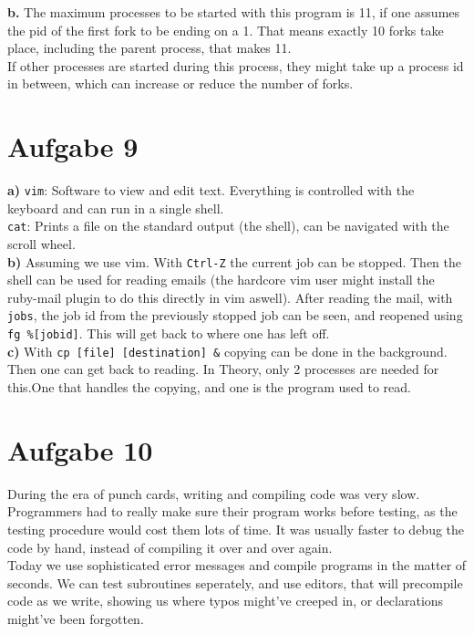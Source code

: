 \documentclass{article}
\begin{document}
\textbf{b.} The maximum processes to be started with this program is 11, if 
one assumes the pid of the first fork to be ending on a 1. That means
exactly 10 forks take place, including the parent process, that makes 11.\\
If other processes are started during this process, they might take up
a process id in between, which can increase or reduce the number of forks.

\section*{Aufgabe 9}
\textbf{a)} \texttt{vim}: Software to view and edit text. Everything is
controlled with the keyboard and can run in a single shell. \\
\texttt{cat}: Prints a file on the standard output (the shell), can be
navigated with the scroll wheel. \\

\textbf{b)} Assuming we use vim.
With \texttt{Ctrl-Z} the current job can be stopped. Then the shell can be
used for reading emails (the hardcore vim user might install the ruby-mail
plugin to do this directly in vim aswell). After reading the mail, with
\texttt{jobs}, the job id from the previously stopped job can be seen, and
reopened using \texttt{fg \%[jobid]}. This will get back to where one has
left off.\\

\textbf{c)} With \texttt{cp [file] [destination] \&} copying can be done in 
the background. Then one can get back to reading. In Theory, only 2 processes
are needed for this.One that handles the copying, and one is the program
used to read.

\section*{Aufgabe 10}
During the era of punch cards, writing and compiling code was very slow.
Programmers had to really make sure their program works before testing, as
the testing procedure would cost them lots of time. It was usually faster to
debug the code by hand, instead of compiling it over and over again.\\
Today we use sophisticated error messages and compile programs in the matter
of seconds. We can test subroutines seperately, and use editors, that
will precompile code as we write, showing us where typos might've creeped
in, or declarations might've been forgotten.
\end{document}
